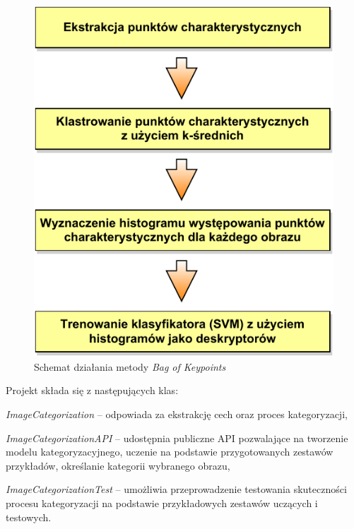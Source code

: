 \begin{figure}[h]
	\centering
	\includegraphics[scale=1.0]{graphics/03_implementacja/bag-of-keypoints.pdf}
	\caption{ Schemat działania metody \emph{Bag of Keypoints} }
	\label{fig:bag-of-keypoints}
\end{figure}

Projekt składa się z następujących klas:
\begin{compactitem}
	\item \emph{ImageCategorization} -- odpowiada za ekstrakcję cech oraz proces kategoryzacji, 
	\item \emph{ImageCategorizationAPI} -- udostępnia publiczne API pozwalające na tworzenie modelu kategoryzacyjnego, uczenie na podstawie przygotowanych zestawów przykładów, określanie kategorii wybranego obrazu,
	\item \emph{ImageCategorizationTest} -- umożliwia przeprowadzenie testowania skuteczności procesu kategoryzacji na podstawie przykładowych zestawów uczących i testowych.
\end{compactitem}


